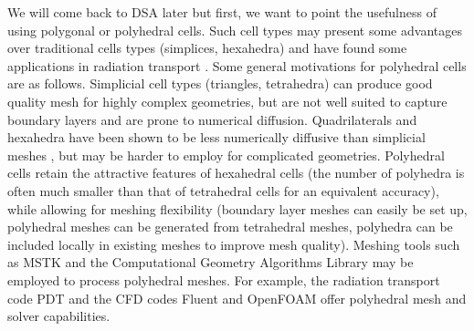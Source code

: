 We will come back to DSA later but first, we want to point the usefulness of
using polygonal or polyhedral cells. Such cell types may present some advantages over
traditional cells types (simplices, hexahedra) and have found some
applications in radiation transport \cite{pwld_3d,pwld_2d,cfm_dfm}. 
Some general motivations for
polyhedral cells are as follows. Simplicial cell types (triangles, tetrahedra)
can produce good  quality mesh for highly complex geometries, but are not
well suited to capture boundary layers and are prone to numerical diffusion.
Quadrilaterals and hexahedra have been shown to be less numerically diffusive
than simplicial meshes \cite{??}, but may be harder to employ for complicated
geometries. Polyhedral cells retain the attractive features of hexahedral
cells  (the number of polyhedra is often much smaller than that of tetrahedral
cells for an equivalent accuracy), while allowing for meshing
flexibility (boundary layer meshes can easily be set up, polyhedral meshes can
be generated from tetrahedral meshes, polyhedra can be included locally in
existing meshes to improve mesh quality). Meshing tools such as MSTK
\cite{mstk} and the Computational Geometry Algorithms Library \cite{cgal} may
be employed to process polyhedral meshes. For example, the radiation transport
code PDT and the CFD codes Fluent and OpenFOAM offer polyhedral mesh and
solver capabilities.

